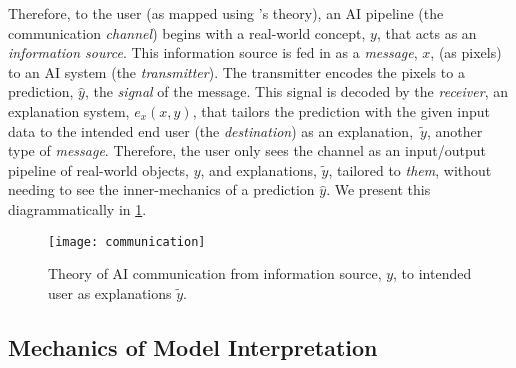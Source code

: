 Therefore, to the user (as mapped using \citeauthor{Shannon:1963ti}'s theory), an AI pipeline (the communication \textit{channel}) begins with a real-world concept, $y$, that acts as an \textit{information source}. This information source is fed in as a \textit{message}, $x$, (as pixels) to an AI system (the \textit{transmitter}). The transmitter encodes the pixels to a prediction, $\hat{y}$, the \textit{signal} of the message. This signal is decoded by the \textit{receiver}, an explanation system, $e_{x}(x,\hat{y})$, that tailors the prediction with the given input data to the intended end user (the \textit{destination}) as an explanation,~$\tilde{y}$, another type of \textit{message}. Therefore, the user only sees the channel as an input/output pipeline of real-world objects, $y$, and explanations, $\tilde{y}$, tailored to \textit{them}, without needing to see the inner-mechanics of a prediction $\hat{y}$. We present this diagrammatically in \cref{fig:literature-review:probabilistic-stochastic:theory-of-ai-communication}.

\begin{figure}[hbt]
  \centering
  \texttt{[image: communication]}
  \caption[Theory of AI communication]{Theory of AI communication from information source, $y$, to intended user as explanations $\tilde{y}$.}
  \label{fig:literature-review:probabilistic-stochastic:theory-of-ai-communication}
\end{figure}

\subsection{Mechanics of Model Interpretation}
\label{ssec:literature-review:probabilistic-stochastic:mechanics}

